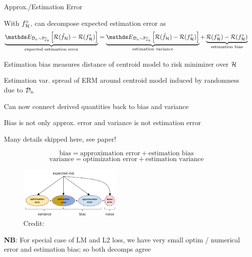 \documentclass[11pt,compress,t,notes=noshow, xcolor=table]{beamer}
\begin{document}
\begin{vbframe}{Approx./Estimation Error }
\begin{itemizeM}
\item With $f^{\circ}_{\mathcal{H}}$, can decompose expected estimation error as
$$
 \underbrace{\E_{\D_n \sim \Pxy^n}\left[\risk(\hat{f}_{\Hspace}) - \risk(f ^{\ast}_{\Hspace})\right]}_{\text{expected estimation error}} = \underbrace{\E_{\D_n \sim \Pxy^n}\left[\risk(\hat{f}_{\Hspace}) - \risk(f^{\circ}_{\Hspace}) \right]}_{\text{estimation variance}} + \underbrace{\risk(f^{\circ}_{\Hspace})-\risk(f^{\ast}_{\Hspace})}_{\text{estimation bias}}   
$$


\item Estimation bias measures distance of centroid model to risk minimizer over $\mathcal{H}$
\item Estimation var. spread of ERM around centroid model induced by randomness due to $\mathcal{D}_n$

\end{itemizeM}




\framebreak

\begin{itemizeM}

\item Can now connect derived quantities back to bias and variance 
\item Bias is not only approx. error and variance is not estimation error
\item Many details skipped here, see paper!

$$ \text{bias} = \text{approximation error} + \text{estimation bias} $$
$$\text{variance} = \text{optimization error} + \text{estimation variance}$$

\begin{figure}
    \centering
    \includegraphics[width = 0.45\textwidth]{figure_man/expected-risk-decomp.png}
    \tiny{\\ Credit: \cite{BROWN2024BIAS}}
  \end{figure}

\item \textbf{NB}: For special case of LM and L2 loss, we have very small optim / numerical error and estimation bias; so both decomps agree

\end{itemizeM}

\end{vbframe}

\endlecture
\end{document}
